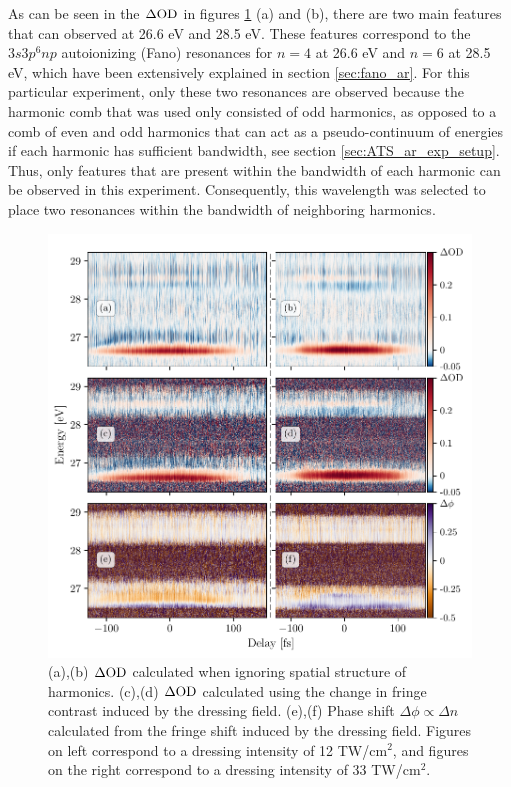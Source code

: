 As can be seen in the $\dod$ in figures \ref{fig:delay_high_low} (a) and (b), there are two main features that can observed at 26.6 eV and 28.5 eV.  These features correspond to the $3s3p^6np$ autoionizing (Fano) resonances for $n=4$ at 26.6 eV and $n=6$ at 28.5 eV, which have been extensively explained in section \ref{sec:fano_ar}.  For this particular experiment, only these two resonances are observed because the harmonic comb that was used only consisted of odd harmonics, as opposed to a comb of even and odd harmonics that can act as a pseudo-continuum of energies if each harmonic has sufficient bandwidth, see section \ref{sec:ATS_ar_exp_setup}.  Thus, only features that are present within the bandwidth of each harmonic can be observed in this experiment.  Consequently, this wavelength was selected to place two resonances within the bandwidth of neighboring harmonics.

\begin{figure}
	\centering
	\includegraphics[width=1.0\textwidth]{figures/CATS/delay_high_low.pdf}
	\caption[Delay-dependent $\dod$ and $\Delta \phi$ measured at high and moderate dressing intensities]{(a),(b) $\dod$ calculated when ignoring spatial structure of harmonics.  (c),(d)  $\dod$ calculated using the change in fringe contrast induced by the dressing field.  (e),(f) Phase shift $\Delta\phi\propto\Delta n $ calculated from the fringe shift induced by the dressing field.  Figures on left correspond to a dressing intensity of 12 TW/cm$^2$, and figures on the right correspond to a dressing intensity of 33 TW/cm$^2$.}
	\label{fig:delay_high_low}
\end{figure}

